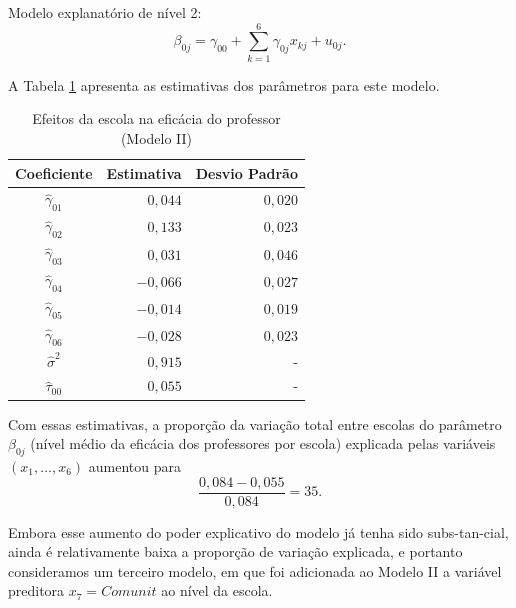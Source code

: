 \documentclass[]{book}
\numberwithin{example}{chapter}
\numberwithin{remark}{chapter}
\numberwithin{definition}{chapter}
\begin{document}
Modelo explanatório de nível 2: \[
\beta _{0j}=\gamma _{00}+\sum\limits_{k=1}^{6}\gamma _{0j}x_{kj}+u_{0j}.
\]

A Tabela \ref{tab95} apresenta as estimativas dos parâmetros para este
modelo.

\begin{center}
\begin{table}[tbp] \centering%
\caption{Efeitos da escola na eficácia do professor (Modelo II)}\bigskip
\label{tab95}
\begin{tabular}{|c|c|c|}
\hline\hline
Coeficiente & Estimativa & Desvio Padrão \\ \hline\hline
$\hat{\gamma}_{01}$ & \multicolumn{1}{|r|}{$0,044$} & \multicolumn{1}{|r|}{$%
0,020$} \\
$\hat{\gamma}_{02}$ & \multicolumn{1}{|r|}{$0,133$} & \multicolumn{1}{|r|}{$%
0,023$} \\
$\hat{\gamma}_{03}$ & \multicolumn{1}{|r|}{$0,031$} & \multicolumn{1}{|r|}{$%
0,046$} \\
$\hat{\gamma}_{04}$ & \multicolumn{1}{|r|}{$-0,066$} & \multicolumn{1}{|r|}{$%
0,027$} \\
$\hat{\gamma}_{05}$ & \multicolumn{1}{|r|}{$-0,014$} & \multicolumn{1}{|r|}{$%
0,019$} \\
$\hat{\gamma}_{06}$ & \multicolumn{1}{|r|}{$-0,028$} & \multicolumn{1}{|r|}{$%
0,023$} \\
$\hat{\sigma}^{2}$ & \multicolumn{1}{|r|}{$0,915$} & \multicolumn{1}{|r|}{-}
\\
$\hat{\tau}_{00}$ & \multicolumn{1}{|r|}{$0,055$} & \multicolumn{1}{|r|}{-}
\\ \hline\hline
\end{tabular}
\end{table}%
\end{center}

Com essas estimativas, a proporção da variação total entre escolas do
parâmetro \(\beta _{0j}\) (nível médio da eficácia dos professores por
escola) explicada pelas variáveis \(\left(x_{1},\ldots ,x_{6}\right)\)
aumentou para \[
\frac{0,084-0,055}{0,084}=35.
\]

Embora esse aumento do poder explicativo do modelo já tenha sido
subs-tan-cial, ainda é relativamente baixa a proporção de variação
explicada, e portanto consideramos um terceiro modelo, em que foi
adicionada ao Modelo II a variável preditora \(x_{7}=Comunit\) ao nível
da escola.
\end{document}

